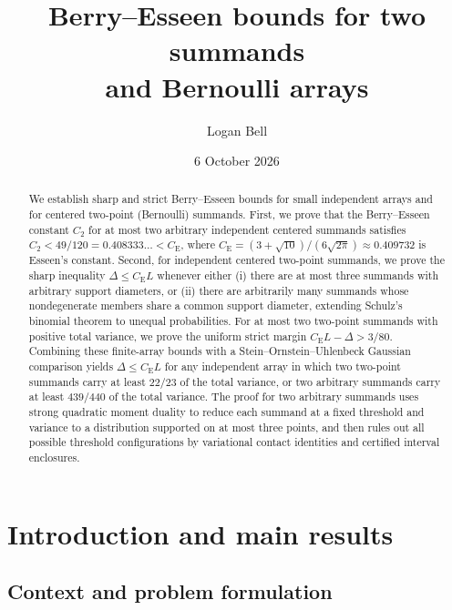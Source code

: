 \documentclass[11pt]{article}
\title{Berry--Esseen bounds for two summands\\and Bernoulli arrays}
\author{Logan Bell}
\date{6 October 2026}
\numberwithin{equation}{section}
\theoremstyle{definition}
\theoremstyle{remark}
\newcommand{\be}{C_{\mathrm E}}
\begin{document}
\maketitle
\begin{abstract}
We establish sharp and strict Berry--Esseen bounds for small independent
arrays and for centered two-point (Bernoulli) summands. First, we prove that
the Berry--Esseen constant $C_2$ for at most two arbitrary independent
centered summands satisfies $C_2<49/120=0.408333\ldots<\be$, where
$\be=(3+\sqrt{10})/(6\sqrt{2\pi})\approx0.409732$ is Esseen's constant.
Second, for independent centered two-point summands, we prove the sharp
inequality $\Delta\le\be L$ whenever either (i) there are at most three
summands with arbitrary support diameters, or (ii) there are arbitrarily
many summands whose nondegenerate members share a common support diameter,
extending Schulz's binomial theorem to unequal probabilities. For at most
two two-point summands with positive total variance, we prove the uniform
strict margin $\be L-\Delta>3/80$. Combining these finite-array bounds with
a Stein--Ornstein--Uhlenbeck Gaussian comparison yields $\Delta\le\be L$
for any independent array in which two two-point summands carry at least
$22/23$ of the total variance, or two arbitrary summands carry at least
$439/440$ of the total variance. The proof for two arbitrary summands uses
strong quadratic moment duality to reduce each summand at a fixed threshold
and variance to a distribution supported on at most three points, and then
rules out all possible threshold configurations by variational contact
identities and certified interval enclosures.
\end{abstract}

\setcounter{tocdepth}{2}
\tableofcontents

\section{Introduction and main results}\label{sec:main}

\subsection{Context and problem formulation}
\end{document}
